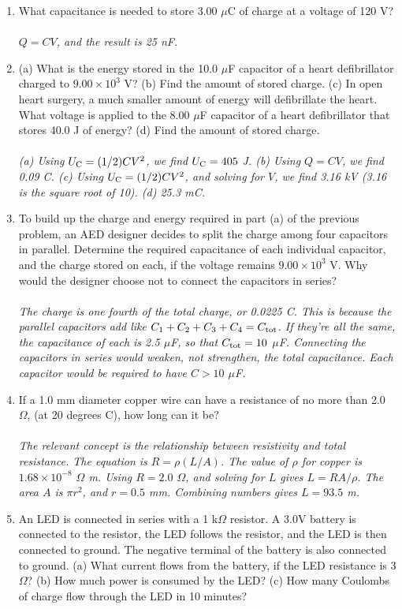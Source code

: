 \documentclass[12pt,twocolumn]{article}
\begin{document}
\noindent
\begin{enumerate}
\item What capacitance is needed to store 3.00 $\mu$C of charge at a voltage of 120 V? \\ \\
\textit{$Q = CV$, and the result is 25 nF.}
\item (a) What is the energy stored in the 10.0 $\mu$F capacitor of a heart defibrillator charged to $9.00\times 10^3$ V? (b) Find the amount of stored charge. (c) In open heart surgery, a much smaller amount of energy will defibrillate the heart.  What voltage is applied to the 8.00 $\mu$F capacitor of a heart defibrillator that stores 40.0 J of energy? (d) Find the amount of stored charge. \\ \\
\textit{(a) Using $U_{\rm C} = (1/2) C V^2$, we find $U_{\rm C} = 405$ J. (b) Using $Q = CV$, we find 0.09 C. (c) Using $U_{\rm C} = (1/2) C V^2$, and solving for $V$, we find 3.16 kV (3.16 is the square root of 10). (d) 25.3 mC.}
\item To build up the charge and energy required in part (a) of the previous problem, an AED designer decides to split the charge among four capacitors in parallel.  Determine the required capacitance of each individual capacitor, and the charge stored on each, if the voltage remains $9.00 \times 10^3$ V.  Why would the designer choose not to connect the capacitors in series? \\ \\
\textit{The charge is one fourth of the total charge, or 0.0225 C.  This is because the parallel capacitors add like $C_1 + C_2 + C_3 + C_4 = C_{\rm tot}$.  If they're all the same, the capacitance of each is 2.5 $\mu$F, so that $C_{\rm tot} = 10$ $\mu$F.  Connecting the capacitors in series would weaken, not strengthen, the total capacitance.  Each capacitor would be required to have $C > 10$ $\mu$F.}
\item If a 1.0 mm diameter copper wire can have a resistance of no more than 2.0 $\Omega$, (at 20 degrees C), how long can it be? \\ \\
\textit{The relevant concept is the relationship between resistivity and total resistance.  The equation is $R = \rho (L/A)$.  The value of $\rho$ for copper is $1.68 \times 10^{-8}$ $\Omega$ m.  Using $R = 2.0$ $\Omega$, and solving for $L$ gives $L = RA/\rho$.  The area $A$ is $\pi r^2$, and $r=0.5$ mm.  Combining numbers gives $L = 93.5$ m.}
\item An LED is connected in series with a 1 k$\Omega$ resistor.  A 3.0V battery is connected to the resistor, the LED follows the resistor, and the LED is then connected to ground.  The negative terminal of the battery is also connected to ground.  (a) What current flows from the battery, if the LED resistance is $3$ $\Omega$? (b) How much power is consumed by the LED? (c) How many Coulombs of charge flow through the LED in 10 minutes? \\ \\

\end{enumerate}
\end{document}
